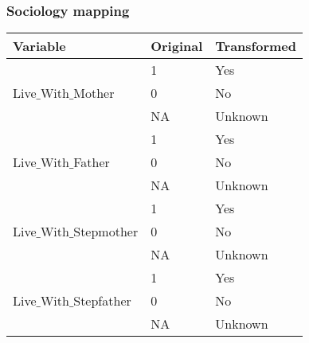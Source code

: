 \subsubsection{Sociology mapping}

\begin{table}[H]

	\tiny

	\centering

    \label{table:Table_SociologyLive_Mapping}
    
	\renewcommand{\arraystretch}{1.5}

    \begin{tabular}{l | l | l}
		\hline
        \rowcolor[HTML]{FF9999}		
		
        \textbf{Variable} & \textbf{Original} & \textbf{Transformed} \\ 		
        
        \hline 
                                    
            \multirow{3}{*}{Live$\_$With$\_$Mother}
            						& \multicolumn{1}{l}{1}     & \multicolumn{1}{l}{Yes}     \\\cline{2-3}
                                    & \multicolumn{1}{l}{0}     & \multicolumn{1}{l}{No} \\\cline{2-3}
                                    & \multicolumn{1}{l}{NA}    & \multicolumn{1}{l}{Unknown}   \\\hline

            \multirow{3}{*}{Live$\_$With$\_$Father}
            						& \multicolumn{1}{l}{1}     & \multicolumn{1}{l}{Yes}     \\\cline{2-3}
                                    & \multicolumn{1}{l}{0}     & \multicolumn{1}{l}{No} \\\cline{2-3}
                                    & \multicolumn{1}{l}{NA}    & \multicolumn{1}{l}{Unknown}   \\\hline

            \multirow{3}{*}{Live$\_$With$\_$Stepmother}
            						& \multicolumn{1}{l}{1}     & \multicolumn{1}{l}{Yes}     \\\cline{2-3}
                                    & \multicolumn{1}{l}{0}     & \multicolumn{1}{l}{No} \\\cline{2-3}
                                    & \multicolumn{1}{l}{NA}    & \multicolumn{1}{l}{Unknown}   \\\hline

            \multirow{3}{*}{Live$\_$With$\_$Stepfather}
            						& \multicolumn{1}{l}{1}     & \multicolumn{1}{l}{Yes}     \\\cline{2-3}
                                    & \multicolumn{1}{l}{0}     & \multicolumn{1}{l}{No} \\\cline{2-3}
                                    & \multicolumn{1}{l}{NA}    & \multicolumn{1}{l}{Unknown}   \\\hline                                    
                                    

\end{tabular}
\end{table}
